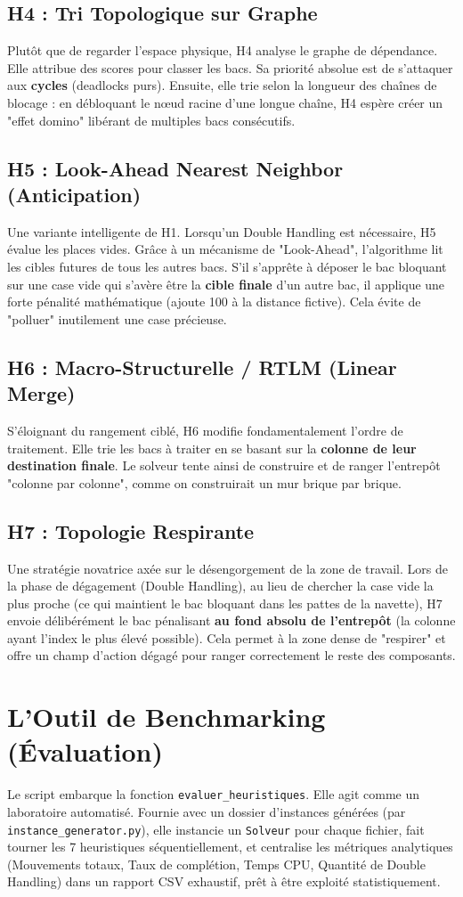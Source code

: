 \documentclass[12pt,a4paper]{article}
\begin{document}
\subsection{H4 : Tri Topologique sur Graphe}
Plutôt que de regarder l'espace physique, H4 analyse le graphe de dépendance. Elle attribue des scores pour classer les bacs. Sa priorité absolue est de s'attaquer aux \textbf{cycles} (deadlocks purs). Ensuite, elle trie selon la longueur des chaînes de blocage : en débloquant le nœud racine d'une longue chaîne, H4 espère créer un "effet domino" libérant de multiples bacs consécutifs.

\subsection{H5 : Look-Ahead Nearest Neighbor (Anticipation)}
Une variante intelligente de H1. Lorsqu'un Double Handling est nécessaire, H5 évalue les places vides. Grâce à un mécanisme de "Look-Ahead", l'algorithme lit les cibles futures de tous les autres bacs. S'il s'apprête à déposer le bac bloquant sur une case vide qui s'avère être la \textbf{cible finale} d'un autre bac, il applique une forte pénalité mathématique (ajoute 100 à la distance fictive). Cela évite de "polluer" inutilement une case précieuse.

\subsection{H6 : Macro-Structurelle / RTLM (Linear Merge)}
S'éloignant du rangement ciblé, H6 modifie fondamentalement l'ordre de traitement. Elle trie les bacs à traiter en se basant sur la \textbf{colonne de leur destination finale}. Le solveur tente ainsi de construire et de ranger l'entrepôt "colonne par colonne", comme on construirait un mur brique par brique.

\subsection{H7 : Topologie Respirante}
Une stratégie novatrice axée sur le désengorgement de la zone de travail. Lors de la phase de dégagement (Double Handling), au lieu de chercher la case vide la plus proche (ce qui maintient le bac bloquant dans les pattes de la navette), H7 envoie délibérément le bac pénalisant \textbf{au fond absolu de l'entrepôt} (la colonne ayant l'index le plus élevé possible). Cela permet à la zone dense de "respirer" et offre un champ d'action dégagé pour ranger correctement le reste des composants.

\section{L'Outil de Benchmarking (Évaluation)}
Le script embarque la fonction \texttt{evaluer\_heuristiques}. Elle agit comme un laboratoire automatisé. Fournie avec un dossier d'instances générées (par \texttt{instance\_generator.py}), elle instancie un \texttt{Solveur} pour chaque fichier, fait tourner les 7 heuristiques séquentiellement, et centralise les métriques analytiques (Mouvements totaux, Taux de complétion, Temps CPU, Quantité de Double Handling) dans un rapport CSV exhaustif, prêt à être exploité statistiquement.
\end{document}
